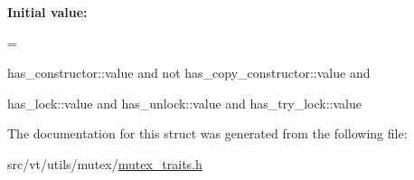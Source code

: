 {\bfseries Initial value\+:}
\begin{DoxyCode}
=
    
    has\_constructor::value and not has\_copy\_constructor::value and
    
    has\_lock::value and has\_unlock::value and
    has\_try\_lock::value
\end{DoxyCode}


The documentation for this struct was generated from the following file\+:\begin{DoxyCompactItemize}
\item 
src/vt/utils/mutex/\hyperlink{mutex__traits_8h}{mutex\+\_\+traits.\+h}\end{DoxyCompactItemize}
